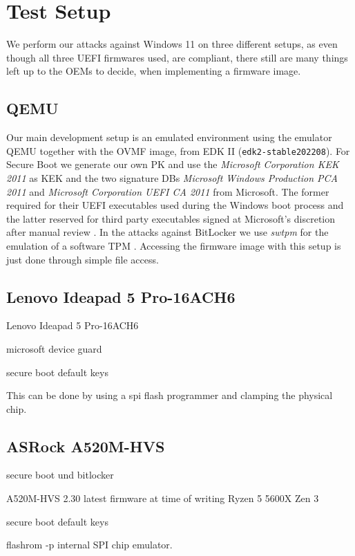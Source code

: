 
\chapter{Test Setup}
\label{sec:test-setup}

We perform our attacks against Windows 11 on three different setups, as even though all three \ac{UEFI} firmwares used, are \cite{pi-spec} compliant, there still are many things left up to the \acp{OEM} to decide, when implementing a firmware image.

\section{\acs{QEMU}}
\label{sec:test-setup:qemu}

Our main development setup is an emulated environment using the emulator \ac{QEMU} \cite{qemu} together with the \ac{OVMF} image, from \ac{EDK} II (\lstinline{edk2-stable202208}).
For Secure Boot we generate our own \ac{PK} and use the \emph{Microsoft Corporation \acs{KEK}  2011} as \ac{KEK} and the two signature \acp{DB} \emph{Microsoft Windows Production PCA 2011} and \emph{Microsoft Corporation UEFI CA 2011} from Microsoft. The former required for their \ac{UEFI} executables used during the Windows boot process \cite{microsoft-secure-boot-guidance} and the latter reserved for third party executables signed at Microsoft's discretion after manual review  \cite{microsoft-uefi-signing}.
In the attacks against BitLocker we use \emph{swtpm} for the emulation of a software \ac{TPM} \cite{swtpm}. Accessing the firmware image with this setup is just done through simple file access.

\section{Lenovo Ideapad 5 Pro-16ACH6}
\label{sec:test-setup:lenovo}

Lenovo Ideapad 5 Pro-16ACH6


microsoft device guard

secure boot default keys


This can be done by using a spi flash programmer and clamping the physical chip. 

\section{ASRock A520M-HVS}
\label{sec:test-setup:asrock}



secure boot und bitlocker


A520M-HVS 2.30 latest firmware at time of writing
Ryzen 5 5600X Zen 3

secure boot default keys


flashrom -p internal
SPI chip emulator. 
